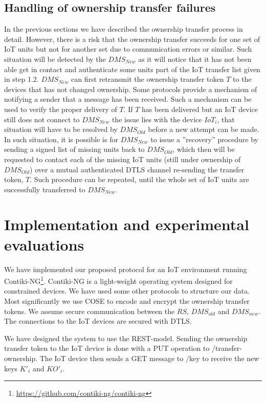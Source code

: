 {\subsection{Handling of ownership transfer failures}
\label{sec:ot:failures}
 In the previous sections we have described the ownership transfer process in detail. However, there is a risk that the ownership transfer succeeds for one set of IoT units but not for another set due to communication errors or similar. Such situation will be detected by the $DMS_{New}$ as it will notice that it has not been able get in contact and authenticate some units part of the IoT transfer list given in step 1.2. $DMS_{New}$ can first retransmit the ownership transfer token $T$ to the devices that has not changed ownership. Some protocols provide a mechanism of notifying a sender that a message has been received. Such a mechanism can be used to verify the proper delivery of $T$. If $T$ has been delivered but an IoT device still does not connect to $DMS_{New}$ the issue lies with the device $IoT_i$, that situation will have to be resolved by $DMS_{Old}$ before a new attempt can be made.  In such situation, it is possible is for $DMS_{New}$ to issue a ''recovery'' procedure by sending a signed list of missing units back to $DMS_{Old}$, which then will be requested to contact each of the missing IoT units (still under ownership of $DMS_{Old}$) over a mutual authenticated DTLS channel re-sending the transfer token, $T$. Such procedure can be repeated, until the whole set of IoT units are successfully transferred to $DMS_{New}$.

\section{Implementation and experimental evaluations}
\label{sec:ot:Implementation}
We have implemented our proposed protocol for an IoT environment running Contiki-NG\footnote{ \url{https://github.com/contiki-ng/contiki-ng}}. Contiki-NG is a light-weight operating system designed for constrained devices. We have used some other protocols to structure our data. Most significantly we use COSE \cite{rfc8152} to encode and encrypt the ownership transfer tokens. We assume secure communication between the $RS$, $DMS_{old}$ and $DMS_{new}$. The connections to the IoT devices are secured with DTLS\cite{rfc6347}. 

We have designed the system to use the REST-model\cite{fielding2000representational}. Sending the ownership transfer token to the IoT device is done with a PUT operation to /transfer-ownership. The IoT device then sends a GET message to /key to receive the new keys $K'_i$ and $KO'_i$. 


}
